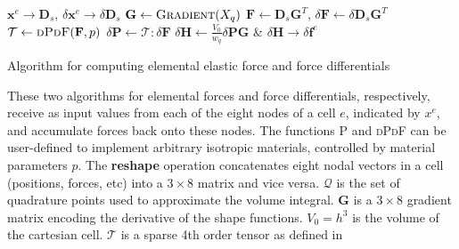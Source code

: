 {\begin{algorithm}[p]
  \begin{minipage}{1\textwidth}
      \setlength{\baselineskip}{1.35em}
      \begin{algorithmic}[1]
        \State \Reshape $\mathbf x^e \rightarrow \mathbf{D}_s$,
        $\delta{} \mathbf x^e \rightarrow \delta{} \mathbf{D}_s$
        \State \Compute $\mathbf G \leftarrow \Call{Gradient}{X_q}$
        \State \Compute $\mathbf{F} \leftarrow
          \mathbf{D}_s\mathbf{G}^T$, $\delta{} \mathbf{F} \leftarrow
        \delta{} \mathbf{D}_s\mathbf{G}^T$
        \State \Compute $\mathcal{T} \leftarrow
          \Call{dPdF}{\mathbf F, p}$
        \State \Compute $\delta\mathbf{P} \leftarrow \mathcal T :
        \delta \mathbf F$
        \State \Accum $\delta{}\mathbf{H} \leftarrow
        \frac{V_0}{w_q}\delta{}\mathbf{PG}$
        \EndFor
        \State \Reshape \& \Accum $\delta{}\mathbf{H} \rightarrow
        \delta{}\mathbf f^e$
        \EndProcedure
      \end{algorithmic}
    \end{minipage}
    \vspace{.15in}
  \caption{Algorithm for computing elemental elastic force and force
    differentials}{These two algorithms for elemental forces and force
    differentials, respectively, receive as input values from each of
    the eight nodes of a cell $e$, indicated by $x^e$, and accumulate
    forces back onto these nodes. The functions \textsc{P} and \textsc{dPdF}
    can be user-defined to implement arbitrary isotropic
    materials, controlled by material parameters $p$. The
    \textbf{reshape} operation concatenates eight nodal vectors in a
    cell (positions, forces, etc) into a $3\times 8$
    matrix and vice versa. $\mathcal Q$ is the set of quadrature points
    used to approximate the volume integral. $\mathbf{G}$ is a
    $3\times 8$ gradient matrix encoding the derivative of the shape
    functions. $V_0=h^3$ is the volume of the
    cartesian cell. $\mathcal{T}$ is a sparse 4th order tensor as
    defined in \protect~\cite{TeranSIF:2005} }
  \label{alg:isotropicforces}
\end{algorithm}
\clearpage
}


